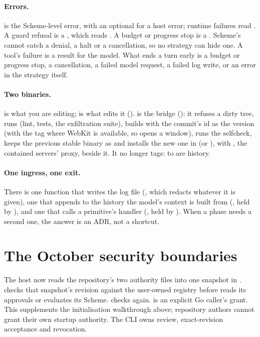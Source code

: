 \paragraph{Errors.}  is the Scheme-level error, with
an optional  for a host error; runtime failures read
. A guard refusal is a , which reads
. A budget or progress stop is a
. Scheme's  cannot catch a denial, a halt or
a cancellation, so no strategy can hide one. A tool's failure is a result
for the model. What ends a turn early is a budget or progress stop, a
cancellation, a failed model request, a failed log write, or an error in
the strategy itself.

\paragraph{Two binaries.}  is what you are editing;
 is what edits it ().  is
the bridge (): it refuses a dirty tree, runs 
(lint, tests, the exfiltration suite), builds with the commit's id as the
version (with the  tag where WebKit is available, so
 opens a window), runs the selfcheck, keeps the
previous stable binary as  and installs the new
one in  (or ),
with , the contained servers' proxy, beside it.
It no longer tags:  to  are
history.

\paragraph{One ingress, one exit.} There is one function that writes the
log file (, which redacts whatever it is given),
one that appends to the history the model's context is built from
(, held by ), and one
that calls a primitive's handler (, held by
). When a phase needs a second one, the
answer is an ADR, not a shortcut.

\section{The October security boundaries}

The host now reads the repository's two authority files into one snapshot in
.  checks that snapshot's
revision against the user-owned registry before  reads its
approvals or  evaluates its Scheme.  checks again.
 is an explicit Go caller's grant. This supplements the
initialisation walkthrough above; repository authors cannot grant their own
startup authority. The CLI owns review, exact-revision acceptance and revocation.


